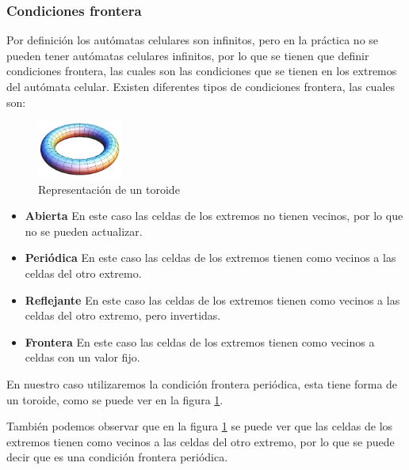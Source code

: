     \subsubsection{Condiciones frontera}
        Por definici\'on los aut\'omatas celulares son infinitos, pero en la pr\'actica no se pueden tener aut\'omatas celulares
            infinitos, por lo que se tienen que definir condiciones frontera, las cuales son las condiciones que se tienen en los
            extremos del aut\'omata celular. Existen diferentes tipos de condiciones frontera, las cuales son:
            \vskip 0.5cm
        \begin{figure}
            \centering
            \includegraphics[width=0.25\textwidth]{./images/marco_teorico/automatas_celulares/torus.png}
            \caption{Representaci\'on de un toroide \cite{Sharma2022}}
            \label{fig:toroide}
        \end{figure}
        \begin{itemize}
            \item \textbf{Abierta} En este caso las celdas de los extremos no tienen vecinos, por lo que no se pueden actualizar.
            \item \textbf{Peri\'odica} En este caso las celdas de los extremos tienen como vecinos a las celdas del otro extremo.
            \item \textbf{Reflejante} En este caso las celdas de los extremos tienen como vecinos a las celdas del otro extremo, pero
                invertidas.
            \item \textbf{Frontera} En este caso las celdas de los extremos tienen como vecinos a celdas con un valor fijo.
        \end{itemize}
    \vskip 0.5cm
    En nuestro caso utilizaremos la condici\'on frontera peri\'odica, esta tiene forma de un toroide, como se puede ver en la figura
        \ref{fig:toroide}.
        \vskip 0.5cm
        
        Tambi\'en podemos observar que en la figura \ref{fig:toroide} se puede ver que las celdas de los extremos tienen como
            vecinos a las celdas del otro extremo, por lo que se puede decir que es una condici\'on frontera peri\'odica.
        \vskip 0.5cm